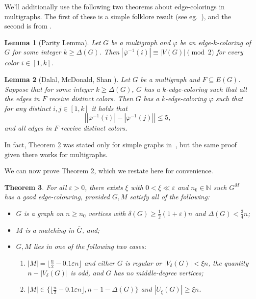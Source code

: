 \documentclass[11pt, oneside]{article}
\newcommand{\ve}{\varepsilon}
\newcommand{\pbar}{\overline{\varphi}}
\newtheorem{theorem}{Theorem}
\newtheorem{lemma}[theorem]{Lemma}
\begin{document}
We'll additionally use the following two theorems about edge-colorings in multigraphs. The first of these is a simple folklore result (see eg.~\cite[Lemma 2.1]{MR2028248}), and the second is from \cite{DMS}.


\begin{lemma}[Parity Lemma]\label{lem:parity}
	Let $G$ be a multigraph and $\varphi $  be an edge-$k$-coloring  of $G$ for some integer $k\ge \Delta(G)$. 
	Then 
	$|\pbar^{-1}(i)| \equiv |V(G)| \pmod{2}$ for every color $i\in [1,k]$. 
\end{lemma}


\begin{lemma}[Dalal, McDonald, Shan \cite{DMS}]\label{lem:equitable-coloring-precolored-edges}
	Let $G$ be   a multigraph  and $F\subseteq E(G)$. 
	Suppose that for some integer $k\ge \Delta(G)$, 
	$G$ has a $k$-edge-coloring such that all the edges in $F$ receive distinct colors. Then $G$ has 
	a $k$-edge-coloring $\varphi$ such that for any  distinct $i, j\in [1,k]$ it holds that $$\left ||\pbar^{-1}(i)| -|\pbar^{-1}(j)|\right | \le 5,$$ and all edges in $F$ receive distinct colors.
\end{lemma}

In fact, Theorem \ref{lem:equitable-coloring-precolored-edges} was stated only for simple graphs in~\cite{DMS}, but the same proof given there works for multigraphs. 

We can now prove Theorem 2, which we restate here for convenience.


\setcounter{theorem}{1}
\begin{theorem}
    For all $\varepsilon>0$, there exists $\xi $ with  $0<\xi  \ll \ve $ and $ n_0\in\mathbb{N}$ such $G^M$ has a good edge-colouring, provided $G, M$ satisfy all of the following:
    \begin{itemize}
    \item[(a)]  $G$ is a graph on $n\geq n_0$ vertices with $\delta(G)\geq\tfrac{1}{2}(1 + \varepsilon)n$ and $\Delta(G)<\frac{3}{4}n$;
    \item[(b)] $M$ is a matching in $\overline{G}$, and;
    \item[(c)] $G, M$ lies in one of the following two cases:
     \begin{enumerate}[(1)]
        \item $|M|=\lfloor \frac{n}{2} - 0.1 \ve n \rfloor$ and either $G$ is regular or $|V_\delta(G)|<\xi n$, the quantity $n-|V_\delta(G)|$ is odd, and $G$ has no middle-degree vertices;
  \item $|M|\in\{\lfloor \frac{n}{2} - 0.1 \ve n \rfloor, n-1-\Delta(G) \}$ and $|U_\xi(G)| \ge \xi n$.
    \end{enumerate}
    \end{itemize}
\end{theorem}
\end{document}
